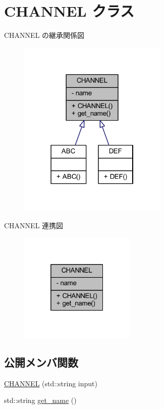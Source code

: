 \hypertarget{class_c_h_a_n_n_e_l}{}\section{C\+H\+A\+N\+N\+EL クラス}
\label{class_c_h_a_n_n_e_l}


C\+H\+A\+N\+N\+EL の継承関係図\nopagebreak
\begin{figure}[H]
\begin{center}
\leavevmode
\includegraphics[width=202pt]{class_c_h_a_n_n_e_l__inherit__graph}
\end{center}
\end{figure}


C\+H\+A\+N\+N\+EL 連携図\nopagebreak
\begin{figure}[H]
\begin{center}
\leavevmode
\includegraphics[width=157pt]{class_c_h_a_n_n_e_l__coll__graph}
\end{center}
\end{figure}
\subsection*{公開メンバ関数}
\begin{DoxyCompactItemize}
\item 
\hyperlink{class_c_h_a_n_n_e_l_a233c9484f865fee53d66da81fb6b9e2d}{C\+H\+A\+N\+N\+EL} (std\+::string input)
\item 
std\+::string \hyperlink{class_c_h_a_n_n_e_l_aa9daccb6ddb609e501245fed29f0adfd}{get\+\_\+name} ()
\end{DoxyCompactItemize}
